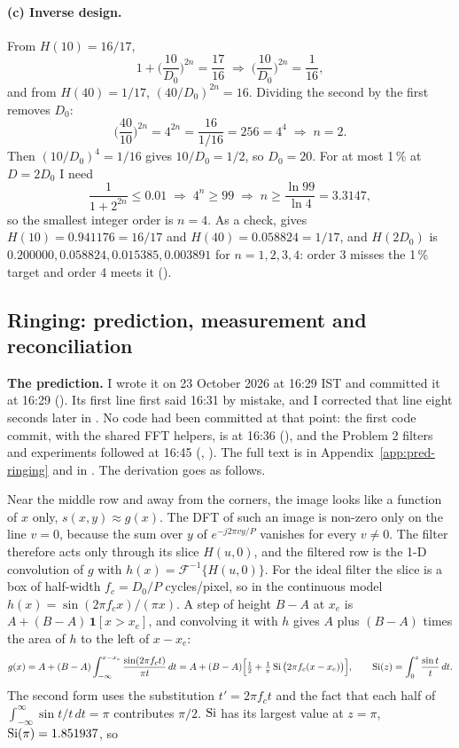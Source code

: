 \paragraph{(c) Inverse design.} From $H(10)=16/17$,
\[
1+\Big(\frac{10}{D_0}\Big)^{2n}=\frac{17}{16}\;\Longrightarrow\;\Big(\frac{10}{D_0}\Big)^{2n}=\frac1{16},
\]
and from $H(40)=1/17$, $(40/D_0)^{2n}=16$. Dividing the second by the first
removes $D_0$:
\[
\Big(\frac{40}{10}\Big)^{2n}=4^{2n}=\frac{16}{1/16}=256=4^4\;\Longrightarrow\;n=2.
\]
Then $(10/D_0)^4=1/16$ gives $10/D_0=1/2$, so $D_0=20$. For at most 1\,\% at
$D=2D_0$ I need
\[
\frac{1}{1+2^{2n}}\le0.01\;\Longrightarrow\;4^n\ge99\;\Longrightarrow\;n\ge\frac{\ln99}{\ln4}=3.3147,
\]
so the smallest integer order is $n=4$. As a check,
 gives $H(10)=0.941176=16/17$
and $H(40)=0.058824=1/17$, and $H(2D_0)$ is
$0.200000, 0.058824, 0.015385, 0.003891$ for $n=1,2,3,4$: order 3 misses the
1\,\% target and order 4 meets it ().

\subsection{Ringing: prediction, measurement and reconciliation}

\textbf{The prediction.} I wrote it on 23 October 2026 at 16:29 IST and
committed it at 16:29 (). Its first line first said 16:31 by
mistake, and I corrected that line eight seconds later in . No code
had been committed at that point: the first code commit, with the shared FFT
helpers, is at 16:36 (), and the Problem 2 filters and experiments
followed at 16:45 (, ). The full text is
in Appendix~\ref{app:pred-ringing} and in
. The derivation goes as
follows.

Near the middle row and away from the corners, the image looks like a function
of $x$ only, $s(x,y)\approx g(x)$. The DFT of such an image is non-zero only on
the line $v=0$, because the sum over $y$ of $e^{-j2\pi vy/P}$ vanishes for every
$v\ne0$. The filter therefore acts only through its slice $H(u,0)$, and the
filtered row is the 1-D convolution of $g$ with $h(x)=\mathcal F^{-1}\{H(u,0)\}$.
For the ideal filter the slice is a box of half-width $f_c=D_0/P$ cycles/pixel,
so in the continuous model $h(x)=\sin(2\pi f_cx)/(\pi x)$. A step of height
$B-A$ at $x_e$ is $A+(B-A)\,\mathbf 1[x>x_e]$, and convolving it with $h$ gives
$A$ plus $(B-A)$ times the area of $h$ to the left of $x-x_e$:
\begin{equation}
g(x)=A+(B-A)\int_{-\infty}^{x-x_e}\frac{\sin(2\pi f_ct)}{\pi t}\,dt
=A+(B-A)\Big[\tfrac12+\tfrac1\pi\operatorname{Si}\big(2\pi f_c(x-x_e)\big)\Big],\qquad
\operatorname{Si}(z)=\int_0^z\frac{\sin t}{t}\,dt .
\label{eq:si}
\end{equation}
The second form uses the substitution $t'=2\pi f_ct$ and the fact that each half
of $\int_{-\infty}^{\infty}\sin t/t\,dt=\pi$ contributes $\pi/2$. $\operatorname{Si}$ has its
largest value at $z=\pi$, $\operatorname{Si}(\pi)=1.851937$, so


